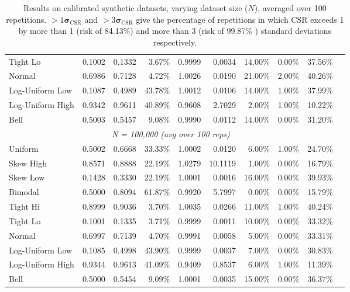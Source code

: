 \documentclass{article}
\theoremstyle{plain}
\theoremstyle{definition}
\theoremstyle{remark}
\begin{document}
\begin{table}[ht]
\begin{tabular}{llrrrrrrrr}
Tight Lo  & 0.1002 & 0.1332 & 3.67\% & 0.9999 & 0.0034 & 14.00\% & 0.00\% & 37.56\% \\
Normal  & 0.6986 & 0.7128 & 4.72\% & 1.0026 & 0.0190 & 21.00\% & 2.00\% & 40.26\% \\
Log-Uniform Low  & 0.1087 & 0.4989 & 43.78\% & 1.0012 & 0.0106 & 14.00\% & 1.00\% & 37.99\% \\
Log-Uniform High  & 0.9342 & 0.9611 & 40.89\% & 0.9608 & 2.7029 & 2.00\% & 1.00\% & 10.22\% \\
Bell  & 0.5003 & 0.5457 & 9.08\% & 0.9990 & 0.0112 & 14.00\% & 0.00\% & 31.20\% \\
\midrule
\multicolumn{9}{c}{\textit{N = 100,000  (avg over 100 reps)}} \\
\midrule
Uniform  & 0.5002 & 0.6668 & 33.33\% & 1.0002 & 0.0120 & 6.00\% & 1.00\% & 24.70\% \\
Skew High  & 0.8571 & 0.8888 & 22.19\% & 1.0279 & 10.1119 & 1.00\% & 0.00\% & 16.79\% \\
Skew Low  & 0.1428 & 0.3330 & 22.19\% & 1.0001 & 0.0016 & 16.00\% & 0.00\% & 39.93\% \\
Bimodal  & 0.5000 & 0.8094 & 61.87\% & 0.9920 & 5.7997 & 0.00\% & 0.00\% & 15.79\% \\
Tight Hi  & 0.8999 & 0.9036 & 3.70\% & 1.0035 & 0.0266 & 11.00\% & 1.00\% & 40.24\% \\
Tight Lo  & 0.1001 & 0.1335 & 3.71\% & 0.9999 & 0.0011 & 10.00\% & 0.00\% & 33.32\% \\
Normal  & 0.6997 & 0.7139 & 4.70\% & 0.9991 & 0.0058 & 5.00\% & 0.00\% & 33.31\% \\
Log-Uniform Low  & 0.1085 & 0.4998 & 43.90\% & 0.9999 & 0.0037 & 7.00\% & 0.00\% & 30.83\% \\
Log-Uniform High  & 0.9344 & 0.9613 & 41.09\% & 0.9409 & 0.8537 & 6.00\% & 1.00\% & 11.39\% \\
Bell  & 0.5000 & 0.5454 & 9.09\% & 1.0001 & 0.0035 & 15.00\% & 0.00\% & 36.37\% \\
\bottomrule
\end{tabular}
\caption{Results on calibrated synthetic datasets, varying dataset size ($N$), averaged over 100 repetitions. $>1\boldsymbol{\sigma}_{\mathrm{CSR}}$ and $>3\boldsymbol{\sigma}_{\mathrm{CSR}}$ give the percentage of repetitions in which $\mathrm{CSR}$ exceeds 1 by more than 1 (risk of 84.13\%) and more than 3 (risk of 99.87\% ) standard deviations respectively.}
\label{tab:report_perfect_synthetic}
\end{table}
\end{document}
